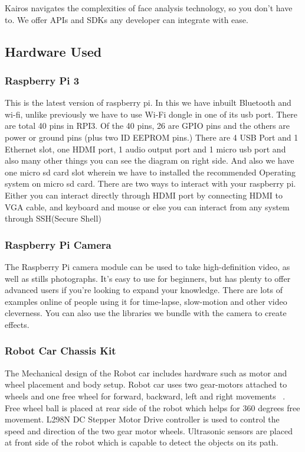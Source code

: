\documentclass[sigconf]{acmart}
\begin{document}
Kairos navigates the complexities of face analysis technology, so you don’t have to. We offer APIs and SDKs any developer can integrate with ease.

\subsection{Hardware Used}
\subsubsection{Raspberry Pi 3}
This is the latest version of raspberry pi. In this we have inbuilt Bluetooth and wi-fi, unlike previously we have to use Wi-Fi dongle in one of its usb port. There are total 40 pins in RPI3. Of the 40 pins, 26 are GPIO pins and the others are power or ground pins (plus two ID EEPROM pins.) There are 4 USB Port and 1 Ethernet slot, one HDMI port, 1 audio output port and 1 micro usb port and also many other things you can see the diagram on right side. And also we have one micro sd card slot wherein we have to installed the recommended Operating system on micro sd card. There are two ways to interact with your raspberry pi. Either you can interact directly through HDMI port by connecting HDMI to VGA cable, and keyboard and mouse or else you can interact from any system through SSH(Secure Shell)

\subsubsection{Raspberry Pi Camera}
The Raspberry Pi camera module can be used to take high-definition video, as well as stills photographs. It’s easy to use for beginners, but has plenty to offer advanced users if you’re looking to expand your knowledge. There are lots of examples online of people using it for time-lapse, slow-motion and other video cleverness. You can also use the libraries we bundle with the camera to create effects.

\subsubsection{Robot Car Chassis Kit}
The Mechanical design of the Robot car includes hardware such as motor and wheel placement and body setup. Robot car uses two gear-motors attached to wheels and one free wheel for forward, backward, left and right movements ~\cite{arduino2015}. Free wheel ball is placed at rear side of the robot which helps for 360 degrees free movement. L298N DC Stepper Motor Drive controller is used to control the speed and direction of the two gear motor wheels. Ultrasonic sensors are placed at front side of the robot which is capable to detect the objects on its path.
\end{document}
